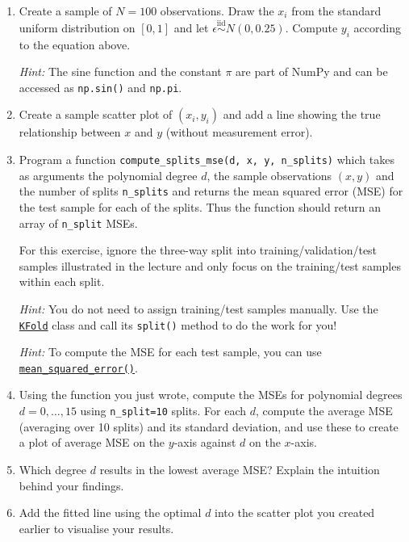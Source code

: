 \documentclass{scrartcl}
\begin{document}
\begin{enumerate}
\def\labelenumi{\arabic{enumi}.}
\item
  Create a sample of \(N=100\) observations. Draw the \(x_i\) from the
  standard uniform distribution on \([0, 1]\) and let
  \(\epsilon \stackrel{\text{iid}}{\sim} N(0, 0.25)\). Compute \(y_i\)
  according to the equation above.

  \emph{Hint:} The sine function and the constant \(\pi\) are part of
  NumPy and can be accessed as \texttt{np.sin()} and \texttt{np.pi}.
\item
  Create a sample scatter plot of \((x_i, y_i)\) and add a line showing
  the true relationship between \(x\) and \(y\) (without measurement
  error).
\item
  Program a function
  \texttt{compute\_splits\_mse(d,\ x,\ y,\ n\_splits)} which takes as
  arguments the polynomial degree \(d\), the sample observations
  \((x, y)\) and the number of splits \texttt{n\_splits} and returns the
  mean squared error (MSE) for the test sample for each of the splits.
  Thus the function should return an array of \texttt{n\_split} MSEs.

  For this exercise, ignore the three-way split into
  training/validation/test samples illustrated in the lecture and only
  focus on the training/test samples within each split.

  \emph{Hint:} You do not need to assign training/test samples manually.
  Use the
  \href{https://scikit-learn.org/stable/modules/generated/sklearn.model_selection.KFold.html}{\texttt{KFold}}
  class and call its \texttt{split()} method to do the work for you!

  \emph{Hint:} To compute the MSE for each test sample, you can use
  \href{https://scikit-learn.org/stable/modules/generated/sklearn.metrics.mean_squared_error.html}{\texttt{mean\_squared\_error()}}.
\item
  Using the function you just wrote, compute the MSEs for polynomial
  degrees \(d = 0,\dots,15\) using \texttt{n\_split=10} splits. For each
  \(d\), compute the average MSE (averaging over 10 splits) and its
  standard deviation, and use these to create a plot of average MSE on
  the \(y\)-axis against \(d\) on the \(x\)-axis.
\item
  Which degree \(d\) results in the lowest average MSE? Explain the
  intuition behind your findings.
\item
  Add the fitted line using the optimal \(d\) into the scatter plot you
  created earlier to visualise your results.
\end{enumerate}
\end{document}
